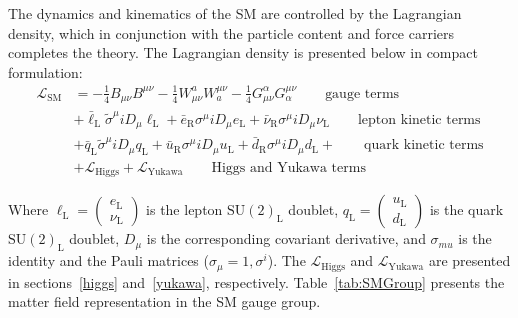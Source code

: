 The dynamics and kinematics of the SM are controlled by the
Lagrangian density, which in conjunction with the particle content and
force carriers completes the theory. The Lagrangian density is
presented below in compact formulation:
\begin{equation}
 \begin{aligned}
        \mathcal{L}_{\mathrm{SM}}& = -\frac{1}{4}B_{\mu\nu}B^{\mu\nu}
        -\frac{1}{4}W^{a}_{\mu\nu}W^{\mu\nu}_{a} - \frac{1}{4}G^{\alpha}_{\mu\nu}G^{\mu\nu}_{\alpha} 
        \qquad \text{gauge terms}\\
        &+\bar{\ell}_{\mathrm{L}}\tilde{\sigma}^{\mu}iD_{\mu}\ell_{\mathrm{L}}
        +\bar{e}_{\mathrm{R}}\sigma^{\mu}iD_{\mu}e_{\mathrm{L}} +
        \bar{\nu}_{\mathrm{R}}\sigma^{\mu}iD_{\mu}\nu_{\mathrm{L}} \qquad \text{lepton kinetic terms}\\
        &+\bar{q}_{\mathrm{L}}\tilde{\sigma}^{\mu}iD_{\mu}q_{\mathrm{L}}
        +\bar{u}_{\mathrm{R}}\sigma^{\mu}iD_{\mu}u_{\mathrm{L}} +
        \bar{d}_{\mathrm{R}}\sigma^{\mu}iD_{\mu}d_{\mathrm{L}} + \qquad \text{quark kinetic terms}\\
        &+\mathcal{L}_{\mathrm{Higgs}} +
        \mathcal{L}_{\mathrm{Yukawa}}\qquad \text{Higgs and Yukawa terms}
       \end{aligned}
\label{eq:theSMlagrangian}
\end{equation}

Where $\ell_{\mathrm{L}}=\begin{pmatrix}e_{\mathrm{L}}\\
  \nu_{\mathrm{L}}\end{pmatrix}$ is the lepton $\mathrm{SU(2)_{L}}$
doublet, $q_{\mathrm{L}}=\begin{pmatrix}u_{\mathrm{L}}\\
  d_{\mathrm{L}}\end{pmatrix}$ is the quark $\mathrm{SU(2)_{L}}$
doublet, $D_{\mu}$ is the corresponding covariant derivative, and
 $\sigma_{mu}$ is the identity and the Pauli matrices ($\sigma_{\mu} = {1,\sigma^{i}}$).
The $\mathcal{L}_{\mathrm{Higgs}}$ and $\mathcal{L}_{\mathrm{Yukawa}}$
are presented in sections~\ref{higgs} and~\ref{yukawa}, respectively.
Table~\ref{tab:SMGroup} presents the matter field representation in
the SM gauge group.

